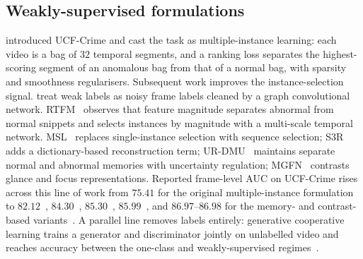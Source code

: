 \documentclass[11pt]{article}
\begin{document}
\subsection{Weakly-supervised formulations}
\citet{sultani2018real} introduced UCF-Crime and cast the task as multiple-instance
learning: each video is a bag of $32$ temporal segments, and a ranking loss
separates the highest-scoring segment of an anomalous bag from that of a normal
bag, with sparsity and smoothness regularisers. Subsequent work improves the
instance-selection signal. \citet{zhong2019graph} treat weak labels as noisy
frame labels cleaned by a graph convolutional network. RTFM~\citep{tian2021weakly}
observes that feature magnitude separates abnormal from normal snippets and
selects instances by magnitude with a multi-scale temporal network.
MSL~\citep{li2022self} replaces single-instance selection with sequence
selection; S3R~\citep{wu2022self} adds a dictionary-based reconstruction term;
UR-DMU~\citep{zhou2023dual} maintains separate normal and abnormal memories with
uncertainty regulation; MGFN~\citep{chen2023mgfn} contrasts glance and focus
representations. Reported frame-level AUC on UCF-Crime rises across this line of
work from $75.41$ for the original multiple-instance
formulation~\citep{sultani2018real} to $82.12$~\citep{zhong2019graph},
$84.30$~\citep{tian2021weakly}, $85.30$~\citep{li2022self},
$85.99$~\citep{wu2022self}, and $86.97$--$86.98$ for the memory- and
contrast-based variants~\citep{zhou2023dual,chen2023mgfn}. A parallel line removes labels entirely: generative cooperative
learning trains a generator and discriminator jointly on unlabelled video and
reaches accuracy between the one-class and weakly-supervised
regimes~\citep{zaheer2022generative}.
\end{document}
